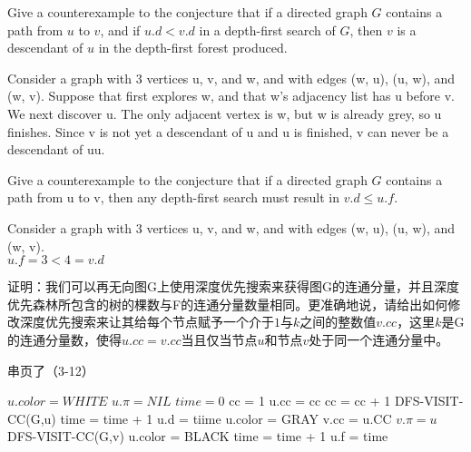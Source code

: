 \documentclass[a4paper, justified]{tufte-handout}
\begin{document}
\begin{problem}[TC 22.3-8]
Give a counterexample to the conjecture that if a directed graph $G$ contains a path from $u$ to $v$, and if $u.d < v.d$ in a depth-first search of $G$, then $v$ is a descendant of $u$ in the depth-first forest produced.
\end{problem}

\begin{solution}
  Consider a graph with 3 vertices u, v, and w, and with edges (w, u), (u, w), and (w, v). Suppose that  first explores w, and that w's adjacency list has u before v. We next discover u. The only adjacent vertex is w, but w is already grey, so u finishes. Since v is not yet a descendant of u and u is finished, v can never be a descendant of uu.
\end{solution}

\begin{problem}[TC 22.3-9]
Give a counterexample to the conjecture that if a directed graph $G$ contains a path from u to v, then any depth-first search must result in $v.d \le u.f$.
\end{problem}

\begin{solution}
  Consider a graph with 3 vertices u, v, and w, and with edges (w, u), (u, w), and (w, v).\\
  $u.f = 3 < 4 = v.d$
\end{solution}

\begin{problem}[TC 22.3-12]
证明：我们可以再无向图G上使用深度优先搜索来获得图G的连通分量，并且深度优先森林所包含的树的棵数与F的连通分量数量相同。更准确地说，请给出如何修改深度优先搜索来让其给每个节点赋予一个介于$1$与$k$之间的整数值$v.cc$，这里$k$是G的连通分量数，使得$u.cc=v.cc$当且仅当节点$u$和节点$v$处于同一个连通分量中。
\end{problem}

\begin{solution}
  串页了（3-12）
  \begin{algorithm}
    \begin{algorithmic}
      \State $u.color = WHITE$
      \State $u.\pi =NIL$
      \EndFor
      \State $time = 0$
      \State cc = 1
      \State u.cc = cc
      \State cc = cc + 1
      \State DFS-VISIT-CC(G,u)
      \EndIf
      \EndFor
      \EndProcedure
      \State time = time + 1
      \State u.d = tiime
      \State u.color = GRAY
      \State v.cc = u.CC
      \State $v.\pi = u$
      \State DFS-VISIT-CC(G,v)
      \EndIf
      \EndFor
      \State u.color = BLACK
      \State time = time + 1
      \State u.f = time
      \EndProcedure
    \end{algorithmic}
  \end{algorithm}
\end{solution}
\end{document}
